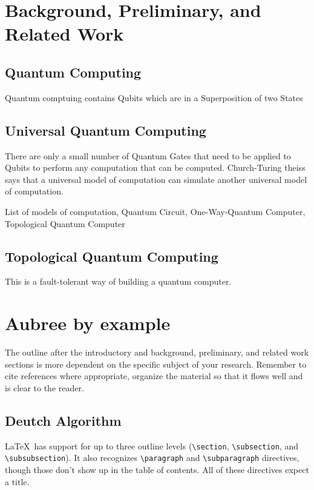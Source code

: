 \documentclass{article}
\begin{document}
\section{Background, Preliminary, and Related Work}
\subsection{Quantum Computing}
Quantum comptuing contains Qubits which are in a Superposition of two States

\subsection{Universal Quantum Computing}
There are only a small number of Quantum Gates that need to be applied to Qubits to perform any computation that can be computed. Church-Turing theiss says that a universal model of computation can simulate another universal model of computation.

List of models of computation, Quantum Circuit, One-Way-Quantum Computer, Topological Quantum Computer

\subsection{Topological Quantum Computing}
This is a fault-tolerant way of building a quantum computer. 
\pagebreak

\section{Aubree by example}

The outline after the introductory and background, preliminary, and related work sections is more dependent on the specific subject of your research.  Remember to cite references where appropriate, organize the material so that it flows well and is clear to the reader.

\subsection{Deutch Algorithm}

\LaTeX\ has support for up to three outline levels (\verb!\section!, \verb!\subsection!, and \verb!\subsubsection!).  It also recognizes \verb!\paragraph! and \verb!\subparagraph! directives, though those don't show up in the table of contents.  All of these directives expect a title.
\end{document}
